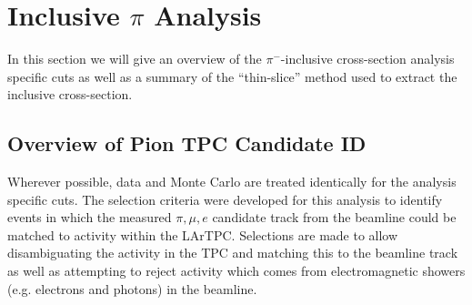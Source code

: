 \section{Inclusive $\pi$ Analysis}\label{sec:PionAnalysis}

In this section we will give an overview of the $\pi^{-}$-inclusive cross-section analysis specific cuts as well as a summary of the ``thin-slice'' method used to extract the inclusive cross-section.


\subsection{Overview of Pion TPC Candidate ID}\label{sec:TPCCandidateSelect}
Wherever possible, data and Monte Carlo are treated identically for the analysis specific cuts. The selection criteria were developed for this analysis to identify events in which the measured $\pi, \mu, e$ candidate track from the beamline could be matched to activity within the LArTPC. Selections are made to allow disambiguating the activity in the TPC and matching this to the beamline track as well as attempting to reject activity which comes from electromagnetic showers (e.g. electrons and photons) in the beamline.

